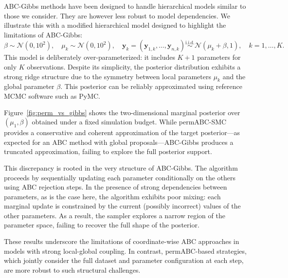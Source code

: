 \documentclass[lineno]{biometrika}
\def\obsdata{\mathbf{y}}
\def\al#1{\textcolor{purple}{\textit{// AL: #1}}}
\begin{document}
ABC-Gibbs methods \citep{clarte2021componentwise,rodrigues2020likelihood} have been designed to handle hierarchical models similar to those we consider. They are however less robust to model dependencies. We illustrate this with a modified hierarchical model designed to highlight the limitations of ABC-Gibbs:
\begin{equation*}
    \label{eqgauss_robin}
    \beta \sim \mathcal{N}(0, 10^2), \quad \mu_k \sim \mathcal{N}(0, 10^2), \quad \obsdata_k = (\obsdata_{1,k}, \dots, \obsdata_{n,k}) \overset{\text{i.i.d.}}{\sim} \mathcal{N}(\mu_k + \beta, 1), \quad k = 1, \dots, K.
\end{equation*}
This model is deliberately over-parameterized: it includes \( K+1 \) parameters for only \( K \) observations. Despite its simplicity, the posterior distribution exhibits a strong ridge structure due to the symmetry between local parameters \( \mu_k \) and the global parameter \( \beta \). This posterior can be reliably approximated using reference MCMC software such as PyMC. 

Figure~\ref{fig:perm_vs_gibbs} shows the two-dimensional marginal posterior over \( (\mu_1, \beta) \) obtained under a fixed simulation budget. While permABC-SMC provides a conservative and coherent approximation of the target posterior—as expected for an ABC method with global proposals—ABC-Gibbs produces a truncated approximation, failing to explore the full posterior support.

This discrepancy is rooted in the very structure of ABC-Gibbs. The algorithm proceeds by sequentially updating each parameter conditionally on the others using ABC rejection steps. In the presence of strong dependencies between parameters, as is the case here, the algorithm exhibits poor mixing: each marginal update is constrained by the current (possibly incorrect) values of the other parameters. As a result, the sampler explores a narrow region of the parameter space, failing to recover the full shape of the posterior.

These results underscore the limitations of coordinate-wise ABC approaches in models with strong local-global coupling. In contrast, permABC-based strategies, which jointly consider the full dataset and parameter configuration at each step, are more robust to such structural challenges.
\end{document}
